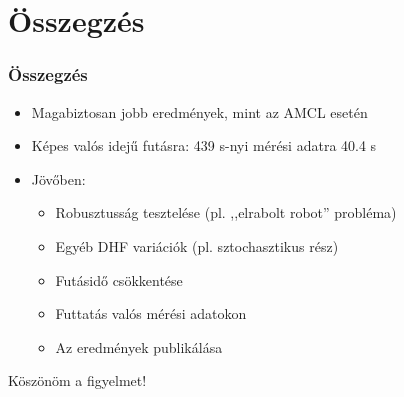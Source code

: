 \documentclass{beamer}
\begin{document}
\section{Összegzés}
\begin{frame}
    \frametitle{Összegzés}
    \begin{itemize}
        \item<1-> Magabiztosan jobb eredmények, mint az AMCL esetén
        \item<1-> Képes valós idejű futásra:  439 s-nyi mérési adatra 40.4 s
        \item<2-> Jövőben:
        \begin{itemize}
            \item Robusztusság tesztelése (pl. ,,elrabolt robot'' probléma)
            \item Egyéb DHF variációk (pl. sztochasztikus rész)
            \item Futásidő csökkentése
            \item Futtatás valós mérési adatokon
            \item Az eredmények publikálása
        \end{itemize}
    \end{itemize}
\end{frame}
\begin{frame}{}
    \centering \Huge
    {Köszönöm a figyelmet!}
\end{frame}
\appendix
\end{document}
